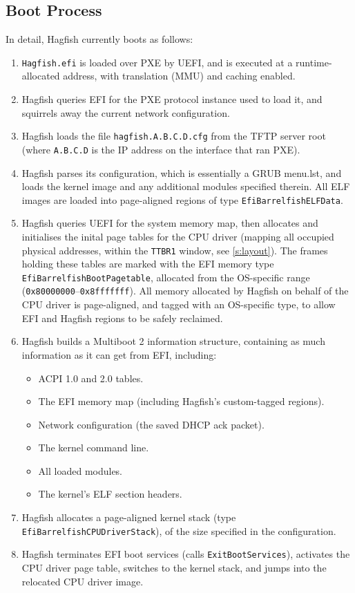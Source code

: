 \documentclass[a4paper,twoside]{report}
\begin{document}
\subsection{Boot Process}

In detail, Hagfish currently boots as follows:

\begin{enumerate}
\item \texttt{Hagfish.efi} is loaded over PXE by UEFI, and is executed at a
runtime-allocated address, with translation (MMU) and caching enabled.
\item Hagfish queries EFI for the PXE protocol instance used to load it, and
squirrels away the current network configuration.
\item Hagfish loads the file \texttt{hagfish.A.B.C.D.cfg} from the TFTP server
root (where \texttt{A.B.C.D} is the IP address on the interface that ran PXE).
\item Hagfish parses its configuration, which is essentially a GRUB menu.lst,
and loads the kernel image and any additional modules specified therein. All
ELF images are loaded into page-aligned regions of type
\texttt{EfiBarrelfishELFData}.
\item Hagfish queries UEFI for the system memory map, then allocates and
initialises the inital page tables for the CPU driver (mapping all occupied
physical addresses, within the \texttt{TTBR1} window, see \autoref{s:layout}).
The frames holding these tables are marked with the EFI memory type
\texttt{EfiBarrelfishBootPagetable}, allocated from the OS-specific range
(\texttt{0x80000000}--\texttt{0x8fffffff}). All memory allocated by Hagfish on
behalf of the CPU driver is page-aligned, and tagged with an OS-specific type,
to allow EFI and Hagfish regions to be safely reclaimed.
\item Hagfish builds a Multiboot 2 information structure, containing as much
information as it can get from EFI, including:
    \begin{itemize}
    \item ACPI 1.0 and 2.0 tables.
    \item The EFI memory map (including Hagfish's custom-tagged regions).
    \item Network configuration (the saved DHCP ack packet).
    \item The kernel command line.
    \item All loaded modules.
    \item The kernel's ELF section headers.
    \end{itemize}
\item Hagfish allocates a page-aligned kernel stack (type
\texttt{EfiBarrelfishCPUDriverStack}), of the size specified in the
configuration.
\item Hagfish terminates EFI boot services (calls \texttt{ExitBootServices}),
activates the CPU driver page table, switches to the kernel stack, and jumps
into the relocated CPU driver image.
\end{enumerate}
\end{document}
